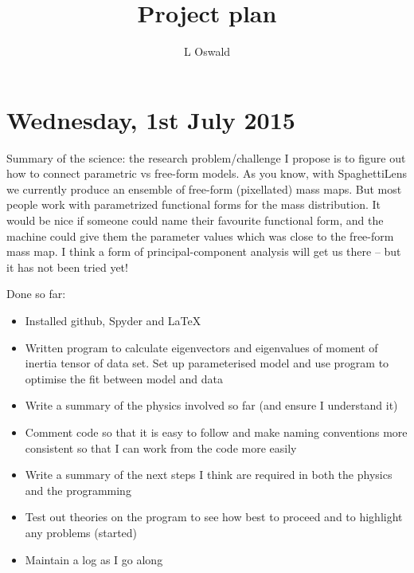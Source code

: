 \documentclass{article}
\begin{document}
\title{Project plan}
\author{L Oswald}
\date{}

\maketitle

\section{Wednesday, 1st July 2015}

Summary of the science: the research problem/challenge I propose is to figure out how
to connect parametric vs free-form models.  As you know, with
SpaghettiLens we currently produce an ensemble of free-form
(pixellated) mass maps.  But most people work with parametrized
functional forms for the mass distribution.  It would be nice if
someone could name their favourite functional form, and the machine
could give them the parameter values which was close to the free-form
mass map.  I think a form of principal-component analysis will get us
there -- but it has not been tried yet!\newline 

\noindent Done so far:
\begin{itemize}
  \item Installed github, Spyder and LaTeX
  \item Written program to calculate eigenvectors and eigenvalues of moment of inertia tensor of data set. Set up parameterised model and use program to optimise the fit between model and data
  \item Write a summary of the physics involved so far (and ensure I understand it)
  \item Comment code so that it is easy to follow and make naming conventions more consistent so that I can work from the code more easily
  \item Write a summary of the next steps I think are required in both the physics and the programming
  \item Test out theories on the program to see how best to proceed and to highlight any problems (started)
  \item Maintain a log as I go along
\end{itemize}\newpage
\end{document}
